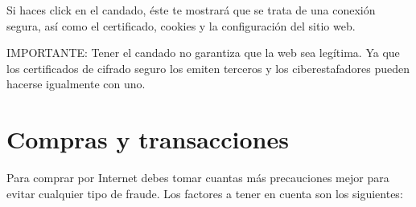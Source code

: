 \documentclass[
  spanish,
  a4paper,
  openany]{book}
\begin{document}
Si haces click en el candado, éste te mostrará que se trata de una conexión segura, así como el certificado, cookies y la configuración del sitio web.

IMPORTANTE: Tener el candado no garantiza que la web sea legítima. Ya que los certificados de cifrado seguro los emiten terceros y los ciberestafadores pueden hacerse igualmente con uno.

\hypertarget{compras-y-transacciones}{%
\section{Compras y transacciones}\label{compras-y-transacciones}}

Para comprar por Internet debes tomar cuantas más precauciones mejor para evitar cualquier tipo de fraude. Los factores a tener en cuenta son los siguientes:
\end{document}
